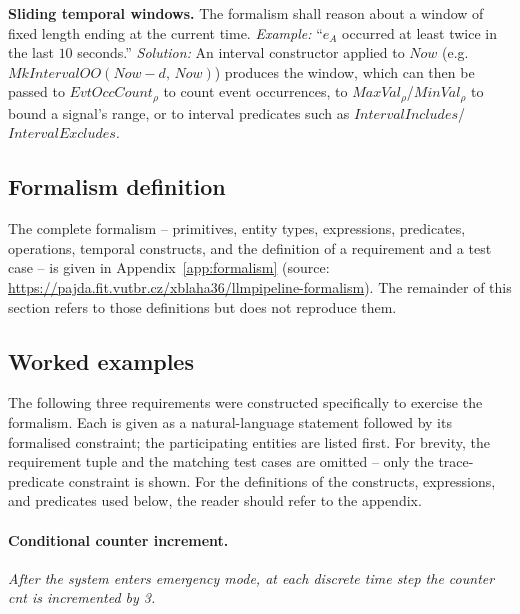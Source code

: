 \textbf{Sliding temporal windows.} The formalism shall reason about a window of fixed length ending at the current time. \textit{Example:} ``$e_A$ occurred at least twice in the last $10$ seconds.'' \textit{Solution:} An interval constructor applied to $\mathit{Now}$ (e.g.\ $\mathit{MkIntervalOO}(\mathit{Now} - d,\, \mathit{Now})$) produces the window, which can then be passed to $\mathit{EvtOccCount}_\rho$ to count event occurrences, to $\mathit{MaxVal}_\rho$/$\mathit{MinVal}_\rho$ to bound a signal's range, or to interval predicates such as $\mathit{IntervalIncludes}$/$\mathit{IntervalExcludes}$.

\subsection{Formalism definition}

The complete formalism -- primitives, entity types, expressions, predicates, operations, temporal constructs, and the definition of a requirement and a test case -- is given in Appendix~\ref{app:formalism} (source: \url{https://pajda.fit.vutbr.cz/xblaha36/llmpipeline-formalism}). The remainder of this section refers to those definitions but does not reproduce them.

\subsection{Worked examples}\label{subsec:worked_examples}

The following three requirements were constructed specifically to exercise the formalism. Each is given as a natural-language statement followed by its formalised constraint; the participating entities are listed first. For brevity, the requirement tuple and the matching test cases are omitted -- only the trace-predicate constraint is shown. For the definitions of the constructs, expressions, and predicates used below, the reader should refer to the appendix.

\paragraph{Conditional counter increment.}
\textit{After the system enters emergency mode, at each discrete time step the counter \textit{cnt} is incremented by 3.}


